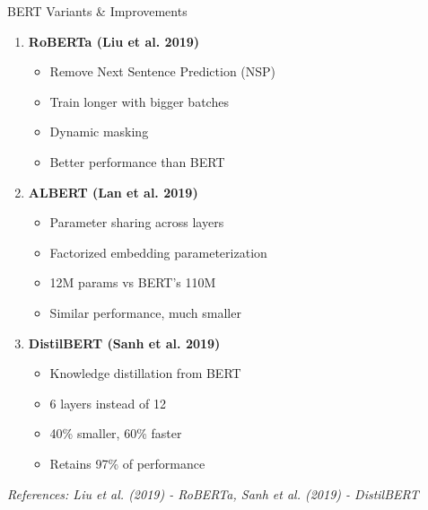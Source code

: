 \documentclass[aspectratio=169]{beamer}
\begin{document}
\begin{frame}[shrink=10]{BERT Variants \& Improvements 🔬}
\begin{enumerate}\setlength{\itemsep}{0pt}
    \item \textbf{RoBERTa (Liu et al. 2019)}
    \begin{itemize}\setlength{\itemsep}{0pt}
        \item Remove Next Sentence Prediction (NSP)
        \item Train longer with bigger batches
        \item Dynamic masking
        \item \alert{Better performance than BERT}
    \end{itemize}

    \vspace{0.5em}

    \item \textbf{ALBERT (Lan et al. 2019)}
    \begin{itemize}\setlength{\itemsep}{0pt}
        \item Parameter sharing across layers
        \item Factorized embedding parameterization
        \item \alert{12M params vs BERT's 110M}
        \item Similar performance, much smaller
    \end{itemize}

    \vspace{0.5em}

    \item \textbf{DistilBERT (Sanh et al. 2019)}
    \begin{itemize}\setlength{\itemsep}{0pt}
        \item Knowledge distillation from BERT
        \item 6 layers instead of 12
        \item \alert{40\% smaller, 60\% faster}
        \item Retains 97\% of performance
    \end{itemize}
\end{enumerate}

\vspace{0.5em}
\small
\textit{References: Liu et al. (2019) - RoBERTa, Sanh et al. (2019) - DistilBERT}
\end{frame}
\end{document}
